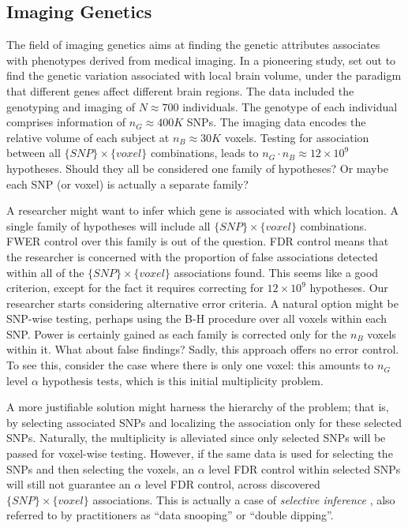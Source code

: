 \documentclass[review,12pt]{article}
\theoremstyle{definition}
\theoremstyle{definition}
\begin{document}
\subsection{\label{eg:imaging_genetics}Imaging Genetics}

The field of imaging genetics aims at finding the genetic attributes associates with phenotypes derived from medical imaging. In a pioneering study, \citet{stein_voxelwise_2010} set out to find the genetic variation associated with local brain volume, under the paradigm that different genes affect different brain regions. 
The data included the genotyping and imaging of $N \approx 700$ individuals. 
The genotype of each individual comprises information of $n_G \approx 400K$ SNPs. 
The imaging data encodes the relative volume of each subject at $n_B \approx 30K$ voxels. 
Testing for association between all $\{SNP\} \times \{voxel\}$ combinations, leads to $n_G \cdot n_B \approx 12\times10^9$ hypotheses. Should they all be considered one family of hypotheses? Or maybe each SNP (or voxel) is actually a separate family? 

A researcher might want to infer which gene is associated with which location.
A single family of hypotheses will include all $\{SNP\} \times \{voxel\}$ combinations. 
FWER control over this family is out of the question. 
FDR control means that the researcher is concerned with the proportion of false associations detected within all of the $\{SNP\} \times \{voxel\}$ associations found. This seems like a good criterion, except for the fact it requires correcting for $12\times10^9$ hypotheses. 
Our researcher starts considering alternative error criteria. 
A natural option might be SNP-wise testing, perhaps using the B-H procedure over all voxels within each SNP. Power is certainly gained as each family is corrected only for the $n_B$ voxels within it. 
What about false findings? Sadly, this approach offers no error control. To see this, consider the case where there is only one voxel: this amounts to $n_G$ level $\alpha$ hypothesis tests, which is this initial multiplicity problem. 

A more justifiable solution might harness the hierarchy of the problem; that is, by selecting associated SNPs and localizing the association only for these selected SNPs. 
Naturally, the multiplicity is alleviated since only selected SNPs will be passed for voxel-wise testing. However, if the same data is used for selecting the SNPs and then selecting the voxels, an $\alpha$ level FDR control within selected SNPs will still not guarantee an $\alpha$ level FDR control, across discovered $\{SNP\} \times \{voxel\}$ associations. This is actually a case of \emph{selective inference} \citep{benjamini_simultaneous_2010}, also referred to by practitioners as ``data snooping'' or ``double dipping''. 
\end{document}
